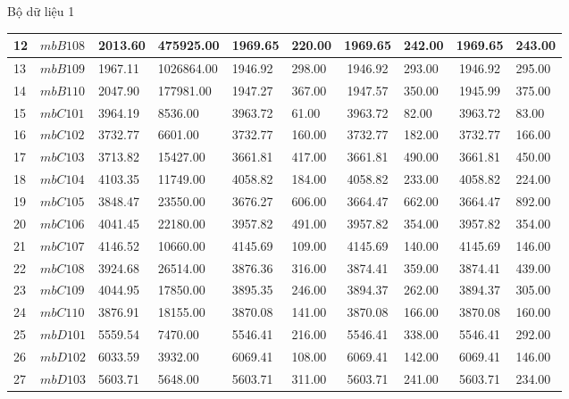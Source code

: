 \documentclass[compress]{beamer}
\begin{document}
\begin{frame}{Bộ dữ liệu 1}
\begin{longtable}{|p{0.2cm}|p{1.0cm}|p{0.55cm}|p{0.85cm}|p{0.6cm}|p{0.7cm}|c|p{0.85cm}|c|p{0.85cm}|}
12&$mbB108$ &    2013.60 & 475925.00 &    1969.65 &     220.00 &    1969.65 &     242.00 &    1969.65 &     243.00\\ \hline 
13&$mbB109$ &    1967.11 &1026864.00 &    1946.92 &     298.00 &    1946.92 &     293.00 &    1946.92 &     295.00\\ \hline 
14&$mbB110$ &    2047.90 & 177981.00 &    1947.27 &     367.00 &    1947.57 &     350.00 &    1945.99 &     375.00\\ \hline 
15&$mbC101$ &    3964.19 &   8536.00 &    3963.72 &      61.00 &    3963.72 &      82.00 &    3963.72 &      83.00\\ \hline 
16&$mbC102$ &    3732.77 &   6601.00 &    3732.77 &     160.00 &    3732.77 &     182.00 &    3732.77 &     166.00\\ \hline 
17&$mbC103$ &    3713.82 &  15427.00 &    3661.81 &     417.00 &    3661.81 &     490.00 &    3661.81 &     450.00\\ \hline 
18&$mbC104$ &    4103.35 &  11749.00 &    4058.82 &     184.00 &    4058.82 &     233.00 &    4058.82 &     224.00\\ \hline 
19&$mbC105$ &    3848.47 &  23550.00 &    3676.27 &     606.00 &    3664.47 &     662.00 &    3664.47 &     892.00\\ \hline 
20&$mbC106$ &    4041.45 &  22180.00 &    3957.82 &     491.00 &    3957.82 &     354.00 &    3957.82 &     354.00\\ \hline 
21&$mbC107$ &    4146.52 &  10660.00 &    4145.69 &     109.00 &    4145.69 &     140.00 &    4145.69 &     146.00\\ \hline 
22&$mbC108$ &    3924.68 &  26514.00 &    3876.36 &     316.00 &    3874.41 &     359.00 &    3874.41 &     439.00\\ \hline 
23&$mbC109$ &    4044.95 &  17850.00 &    3895.35 &     246.00 &    3894.37 &     262.00 &    3894.37 &     305.00\\ \hline 
24&$mbC110$ &    3876.91 &  18155.00 &    3870.08 &     141.00 &    3870.08 &     166.00 &    3870.08 &     160.00\\ \hline 
25&$mbD101$ &    5559.54 &   7470.00 &    5546.41 &     216.00 &    5546.41 &     338.00 &    5546.41 &     292.00\\ \hline 
26&$mbD102$ &    6033.59 &   3932.00 &    6069.41 &     108.00 &    6069.41 &     142.00 &    6069.41 &     146.00\\ \hline 
27&$mbD103$ &    5603.71 &   5648.00 &    5603.71 &     311.00 &    5603.71 &     241.00 &    5603.71 &     234.00\\ \hline 

\end{longtable}
\end{frame}
\end{document}
